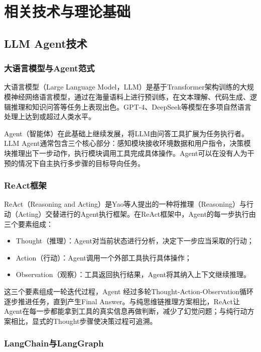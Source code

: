 
\chapter{相关技术与理论基础}

\section{LLM Agent技术}

\subsection{大语言模型与Agent范式}

大语言模型（Large Language Model，LLM）是基于Transformer架构\cite{Vaswani2017Attention}训练的大规模神经网络语言模型，通过在海量语料上进行预训练，在文本理解、代码生成、逻辑推理和知识问答等任务上表现出色。GPT-4\cite{OpenAI2024GPT4}、DeepSeek\cite{DeepSeekAI2024DeepSeekV3}等模型在多项自然语言处理上达到或超过人类水平。

Agent（智能体）在此基础上继续发展，将LLM由问答工具扩展为任务执行者。LLM Agent通常包含三个核心部分：感知模块接收环境数据和用户指令，决策模块推理出下一步动作，执行模块调用工具完成具体操作。Agent可以在没有人为干预的情况下自主执行多步骤的目标导向任务。

\subsection{ReAct框架}

ReAct（Reasoning and Acting）\cite{Yao2022ReAct}是Yao等人提出的一种将推理（Reasoning）与行动（Acting）交替进行的Agent执行框架。在ReAct框架中，Agent的每一步执行由三个要素组成：

\begin{itemize}
  \item Thought（推理）：Agent对当前状态进行分析，决定下一步应当采取的行动；
  \item Action（行动）：Agent调用一个外部工具执行具体操作；
  \item Observation（观察）：工具返回执行结果，Agent将其纳入上下文继续推理。
\end{itemize}

这三个要素组成一轮迭代过程，Agent 经过多轮Thought-Action-Observation循环逐步推进任务，直到产生Final Answer。与纯思维链推理方案相比，ReAct让Agent在每一步都能拿到工具的真实信息再做判断，减少了幻觉问题；与纯行动方案相比，显式的Thought步骤使决策过程可追溯。

\subsection{LangChain与LangGraph}

